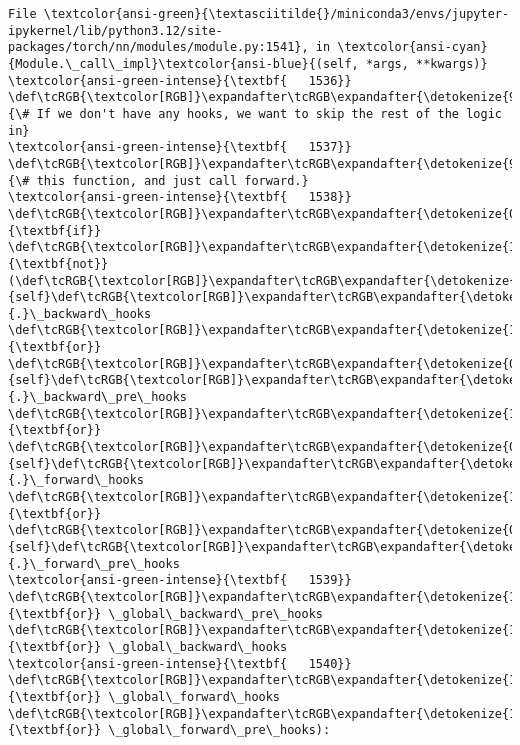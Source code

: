 \documentclass[11pt]{article}
\begin{document}
\begin{Verbatim}[commandchars=\\\{\}, frame=single, framerule=2mm, rulecolor=\color{outerrorbackground}]
File \textcolor{ansi-green}{\textasciitilde{}/miniconda3/envs/jupyter-ipykernel/lib/python3.12/site-packages/torch/nn/modules/module.py:1541}, in \textcolor{ansi-cyan}{Module.\_call\_impl}\textcolor{ansi-blue}{(self, *args, **kwargs)}
\textcolor{ansi-green-intense}{\textbf{   1536}} \def\tcRGB{\textcolor[RGB]}\expandafter\tcRGB\expandafter{\detokenize{95,135,135}}{\# If we don't have any hooks, we want to skip the rest of the logic in}
\textcolor{ansi-green-intense}{\textbf{   1537}} \def\tcRGB{\textcolor[RGB]}\expandafter\tcRGB\expandafter{\detokenize{95,135,135}}{\# this function, and just call forward.}
\textcolor{ansi-green-intense}{\textbf{   1538}} \def\tcRGB{\textcolor[RGB]}\expandafter\tcRGB\expandafter{\detokenize{0,135,0}}{\textbf{if}} \def\tcRGB{\textcolor[RGB]}\expandafter\tcRGB\expandafter{\detokenize{175,0,255}}{\textbf{not}} (\def\tcRGB{\textcolor[RGB]}\expandafter\tcRGB\expandafter{\detokenize{0,135,0}}{self}\def\tcRGB{\textcolor[RGB]}\expandafter\tcRGB\expandafter{\detokenize{98,98,98}}{.}\_backward\_hooks \def\tcRGB{\textcolor[RGB]}\expandafter\tcRGB\expandafter{\detokenize{175,0,255}}{\textbf{or}} \def\tcRGB{\textcolor[RGB]}\expandafter\tcRGB\expandafter{\detokenize{0,135,0}}{self}\def\tcRGB{\textcolor[RGB]}\expandafter\tcRGB\expandafter{\detokenize{98,98,98}}{.}\_backward\_pre\_hooks \def\tcRGB{\textcolor[RGB]}\expandafter\tcRGB\expandafter{\detokenize{175,0,255}}{\textbf{or}} \def\tcRGB{\textcolor[RGB]}\expandafter\tcRGB\expandafter{\detokenize{0,135,0}}{self}\def\tcRGB{\textcolor[RGB]}\expandafter\tcRGB\expandafter{\detokenize{98,98,98}}{.}\_forward\_hooks \def\tcRGB{\textcolor[RGB]}\expandafter\tcRGB\expandafter{\detokenize{175,0,255}}{\textbf{or}} \def\tcRGB{\textcolor[RGB]}\expandafter\tcRGB\expandafter{\detokenize{0,135,0}}{self}\def\tcRGB{\textcolor[RGB]}\expandafter\tcRGB\expandafter{\detokenize{98,98,98}}{.}\_forward\_pre\_hooks
\textcolor{ansi-green-intense}{\textbf{   1539}}         \def\tcRGB{\textcolor[RGB]}\expandafter\tcRGB\expandafter{\detokenize{175,0,255}}{\textbf{or}} \_global\_backward\_pre\_hooks \def\tcRGB{\textcolor[RGB]}\expandafter\tcRGB\expandafter{\detokenize{175,0,255}}{\textbf{or}} \_global\_backward\_hooks
\textcolor{ansi-green-intense}{\textbf{   1540}}         \def\tcRGB{\textcolor[RGB]}\expandafter\tcRGB\expandafter{\detokenize{175,0,255}}{\textbf{or}} \_global\_forward\_hooks \def\tcRGB{\textcolor[RGB]}\expandafter\tcRGB\expandafter{\detokenize{175,0,255}}{\textbf{or}} \_global\_forward\_pre\_hooks):

\end{Verbatim}
\end{document}
